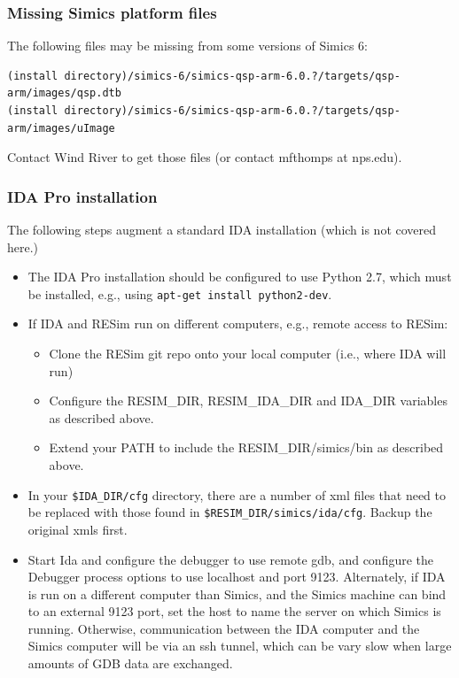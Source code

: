 \documentclass[titlepage]{article}
\begin{document}
\subsubsection{Missing Simics platform files}
The following files may be missing from some versions of Simics 6:
\begin{verbatim}
(install directory)/simics-6/simics-qsp-arm-6.0.?/targets/qsp-arm/images/qsp.dtb
(install directory)/simics-6/simics-qsp-arm-6.0.?/targets/qsp-arm/images/uImage
\end{verbatim}
Contact Wind River to get those files (or contact mfthomps at nps.edu).

\subsubsection{IDA Pro installation}
\label{ida-install}
The following steps augment a standard IDA installation (which is not covered here.)
\begin{itemize}
\item The IDA Pro installation should be configured to use Python 2.7, which must be
installed, e.g., using {\tt apt-get install python2-dev}.
\item If IDA and RESim run on different computers, e.g., remote access to RESim: 
\begin{itemize}
\item Clone the RESim git repo onto your local computer (i.e., where IDA will run)
\item Configure the RESIM\_DIR, RESIM\_IDA\_DIR and
IDA\_DIR variables as described above.  
\item Extend your PATH to include the RESIM\_DIR/simics/bin as described above.
\end{itemize}

\item In your {\tt \$IDA\_DIR/cfg} directory, there are a number of xml files that need to be replaced with those found
in {\tt \$RESIM\_DIR/simics/ida/cfg}.  Backup the original xmls first.

\item Start Ida and configure the debugger to use remote gdb, and configure the Debugger process options to use localhost and port 9123.  Alternately,
if IDA is run on a different computer than Simics, and the Simics machine can bind to an external 9123 port, set the host to name the server
on which Simics is running.  Otherwise, communication between the IDA computer and the Simics computer will be via an ssh tunnel, which can be vary slow
when large amounts of GDB data are exchanged.

\end{itemize}
\end{document}
